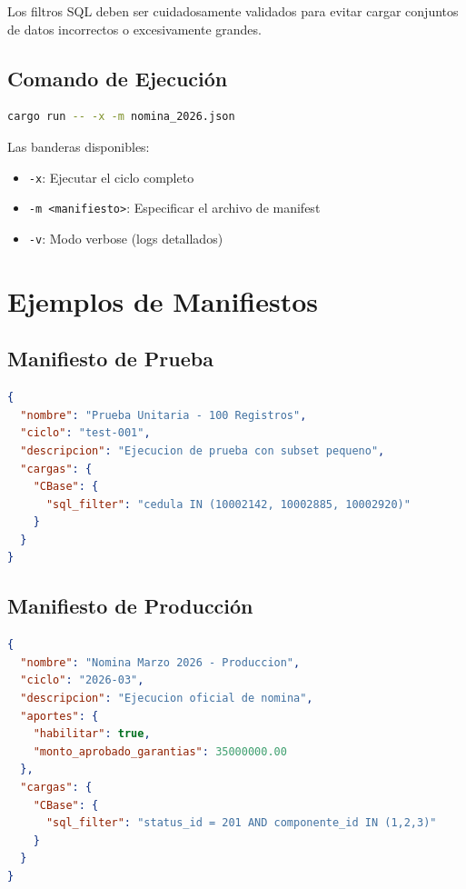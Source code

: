 \begin{cajaAdvertencia}
Los filtros SQL deben ser cuidadosamente validados para evitar cargar conjuntos de datos incorrectos o excesivamente grandes.
\end{cajaAdvertencia}

\subsection{Comando de Ejecución}

\begin{lstlisting}[language=bash,numbers=none]
cargo run -- -x -m nomina_2026.json
\end{lstlisting}

Las banderas disponibles:

\begin{itemize}
    \item \texttt{-x}: Ejecutar el ciclo completo
    \item \texttt{-m <manifiesto>}: Especificar el archivo de manifest
    \item \texttt{-v}: Modo verbose (logs detallados)
\end{itemize}

\section{Ejemplos de Manifiestos}

\subsection{Manifiesto de Prueba}

\begin{lstlisting}[language=json]
{
  "nombre": "Prueba Unitaria - 100 Registros",
  "ciclo": "test-001",
  "descripcion": "Ejecucion de prueba con subset pequeno",
  "cargas": {
    "CBase": {
      "sql_filter": "cedula IN (10002142, 10002885, 10002920)"
    }
  }
}
\end{lstlisting}

\subsection{Manifiesto de Producción}

\begin{lstlisting}[language=json]
{
  "nombre": "Nomina Marzo 2026 - Produccion",
  "ciclo": "2026-03",
  "descripcion": "Ejecucion oficial de nomina",
  "aportes": {
    "habilitar": true,
    "monto_aprobado_garantias": 35000000.00
  },
  "cargas": {
    "CBase": {
      "sql_filter": "status_id = 201 AND componente_id IN (1,2,3)"
    }
  }
}
\end{lstlisting}

\vfill
\newpage
